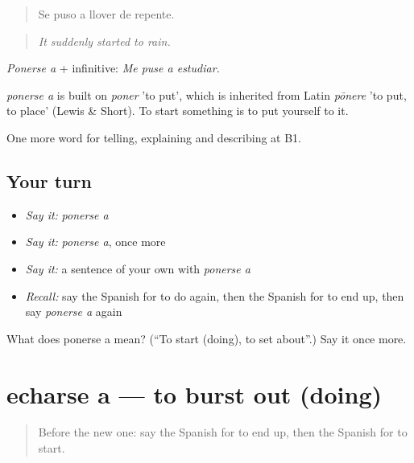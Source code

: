 \begin{quote}
Se puso a llover de repente.
\end{quote}

\begin{quote}
\emph{It suddenly started to rain.}
\end{quote}

\emph{Ponerse a} + infinitive: \emph{Me puse a estudiar.}

\begin{cousinweb}
\emph{ponerse a} is built on \emph{poner} 'to put', which is inherited from Latin \emph{pōnere} 'to put, to place' (Lewis \& Short). To start something is to put yourself to it.
\end{cousinweb}

\begin{grammarlens}[title={What you've built}]
One more word for telling, explaining and describing at B1.
\end{grammarlens}

\subsection*{Your turn}
\begin{itemize}
\raggedright
  \item \emph{Say it:} \emph{ponerse a}
  \item \emph{Say it:} \emph{ponerse a}, once more
  \item \emph{Say it:} a sentence of your own with \emph{ponerse a}
  \item \emph{Recall:} say the Spanish for to do again, then the Spanish for to end up, then say \emph{ponerse a} again
\end{itemize}

\begin{tcolorbox}[breakable,colback=teal!4,colframe=teal!35!black,title={Before you move on}]
What does ponerse a mean? (\textquotedblleft{}To start (doing), to set about\textquotedblright{}.) Say it once more.
\end{tcolorbox}
\section[echarse a]{echarse a — to burst out (doing)}

\label{lesson:ES-C562-echarse-a}



\begin{quote}
Before the new one: say the Spanish for to end up, then the Spanish for to start.
\end{quote}

